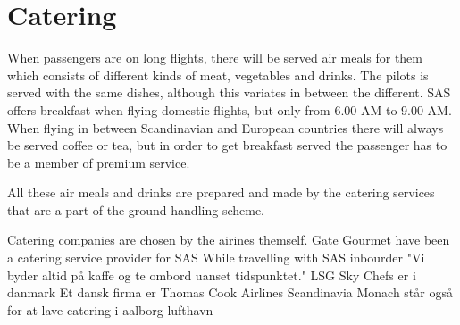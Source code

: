 \section{Catering} 
When passengers are on long flights, there will be served air meals for them which consists of different kinds of meat, vegetables and drinks. The pilots is served with the same dishes, although this variates in between the different\cite{cate_pilotfood1}\cite{cate_pilotfood2}. SAS offers breakfast when flying domestic flights, but only from 6.00 AM to 9.00 AM\cite{cate_SASIndri}. When flying in between Scandinavian and European countries there will always be served coffee or tea, but in order to get breakfast served the passenger has to be a member of premium service\cite{cate_SASscanda}.

All these air meals and drinks are prepared and made by the catering services that are a part of the ground handling scheme.

Catering companies are chosen by the airines themself.
Gate Gourmet have been a catering service provider for SAS
While travelling with SAS inbourder "Vi byder altid på kaffe og te ombord uanset tidspunktet."
LSG Sky Chefs er i danmark
Et dansk firma er Thomas Cook Airlines Scandinavia
Monach står også for at lave catering i aalborg lufthavn